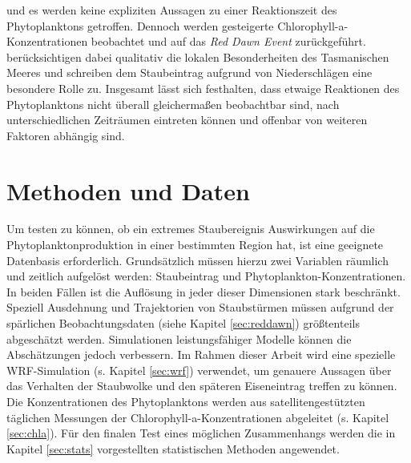 \documentclass[12pt,a4paper,onecolumn]{scrartcl}
\begin{document}
und es werden keine expliziten Aussagen zu einer Reaktionszeit des Phytoplanktons getroffen. Dennoch werden gesteigerte Chlorophyll-a-Konzentrationen beobachtet und auf das \textit{Red Dawn Event} zurückgeführt. \citet{Gabric.2016} berücksichtigen dabei qualitativ die lokalen Besonderheiten des Tasmanischen Meeres und schreiben dem Staubeintrag aufgrund von Niederschlägen eine besondere Rolle zu. Insgesamt lässt sich festhalten, dass etwaige Reaktionen des Phytoplanktons nicht überall gleichermaßen beobachtbar sind, nach unterschiedlichen Zeiträumen eintreten können und offenbar von  weiteren Faktoren abhängig sind. 
\section{Methoden und Daten} \label{sec:Methoden}
Um testen zu können, ob ein extremes Staubereignis Auswirkungen auf die Phytoplanktonproduktion in einer bestimmten Region hat, ist eine geeignete Datenbasis erforderlich. Grundsätzlich müssen hierzu zwei Variablen räumlich und zeitlich aufgelöst werden: Staubeintrag und Phytoplankton-Konzentrationen. In beiden Fällen ist die Auflösung in jeder dieser Dimensionen stark beschränkt. Speziell Ausdehnung und Trajektorien von Staubstürmen müssen aufgrund der spärlichen Beobachtungsdaten (siehe Kapitel  \ref{sec:reddawn}) größtenteils abgeschätzt werden. Simulationen leistungsfähiger Modelle können die Abschätzungen jedoch verbessern. Im Rahmen dieser Arbeit wird eine spezielle WRF-Simulation (s. Kapitel \ref{sec:wrf}) verwendet, um genauere Aussagen über das Verhalten der Staubwolke und den späteren Eiseneintrag treffen zu können. Die Konzentrationen des Phytoplanktons werden aus satellitengestützten täglichen Messungen der Chlorophyll-a-Konzentrationen abgeleitet (s. Kapitel \ref{sec:chla}). Für den finalen Test eines möglichen Zusammenhangs werden die in Kapitel \ref{sec:stats} vorgestellten statistischen Methoden angewendet.
\end{document}
